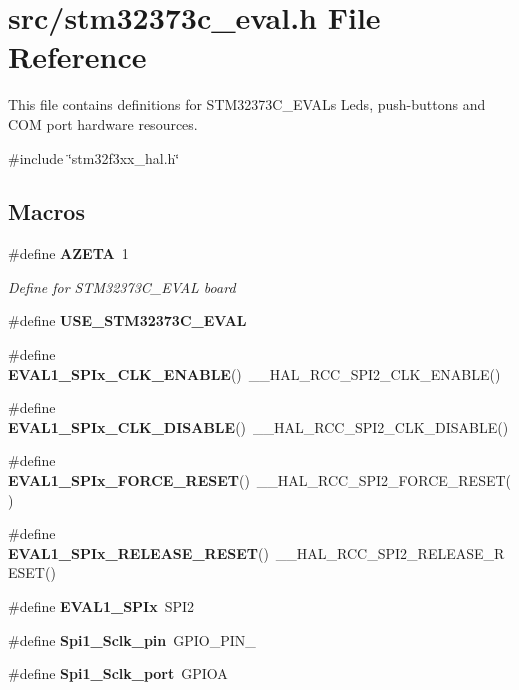 \section{src/stm32373c\+\_\+eval.h File Reference}
\label{stm32373c__eval_8h}


This file contains definitions for S\+T\+M32373\+C\+\_\+\+E\+V\+AL\textquotesingle{}s Leds, push-\/buttons and C\+OM port hardware resources.  


{\ttfamily \#include \char`\"{}stm32f3xx\+\_\+hal.\+h\char`\"{}}\newline
\subsection*{Macros}
\begin{DoxyCompactItemize}
\item 
\#define \textbf{ A\+Z\+E\+TA}~1
\begin{DoxyCompactList}\small\item\em Define for S\+T\+M32373\+C\+\_\+\+E\+V\+AL board ~\newline
 \end{DoxyCompactList}\item 
\#define \textbf{ U\+S\+E\+\_\+\+S\+T\+M32373\+C\+\_\+\+E\+V\+AL}
\item 
\#define \textbf{ E\+V\+A\+L1\+\_\+\+S\+P\+Ix\+\_\+\+C\+L\+K\+\_\+\+E\+N\+A\+B\+LE}()~\+\_\+\+\_\+\+H\+A\+L\+\_\+\+R\+C\+C\+\_\+\+S\+P\+I2\+\_\+\+C\+L\+K\+\_\+\+E\+N\+A\+B\+LE()
\item 
\#define \textbf{ E\+V\+A\+L1\+\_\+\+S\+P\+Ix\+\_\+\+C\+L\+K\+\_\+\+D\+I\+S\+A\+B\+LE}()~\+\_\+\+\_\+\+H\+A\+L\+\_\+\+R\+C\+C\+\_\+\+S\+P\+I2\+\_\+\+C\+L\+K\+\_\+\+D\+I\+S\+A\+B\+LE()
\item 
\#define \textbf{ E\+V\+A\+L1\+\_\+\+S\+P\+Ix\+\_\+\+F\+O\+R\+C\+E\+\_\+\+R\+E\+S\+ET}()~\+\_\+\+\_\+\+H\+A\+L\+\_\+\+R\+C\+C\+\_\+\+S\+P\+I2\+\_\+\+F\+O\+R\+C\+E\+\_\+\+R\+E\+S\+ET()
\item 
\#define \textbf{ E\+V\+A\+L1\+\_\+\+S\+P\+Ix\+\_\+\+R\+E\+L\+E\+A\+S\+E\+\_\+\+R\+E\+S\+ET}()~\+\_\+\+\_\+\+H\+A\+L\+\_\+\+R\+C\+C\+\_\+\+S\+P\+I2\+\_\+\+R\+E\+L\+E\+A\+S\+E\+\_\+\+R\+E\+S\+ET()
\item 
\#define \textbf{ E\+V\+A\+L1\+\_\+\+S\+P\+Ix}~S\+P\+I2
\item 
\#define \textbf{ Spi1\+\_\+\+Sclk\+\_\+pin}~G\+P\+I\+O\+\_\+\+P\+I\+N\+\_
\item 
\#define \textbf{ Spi1\+\_\+\+Sclk\+\_\+port}~G\+P\+I\+OA

\end{DoxyCompactItemize}
